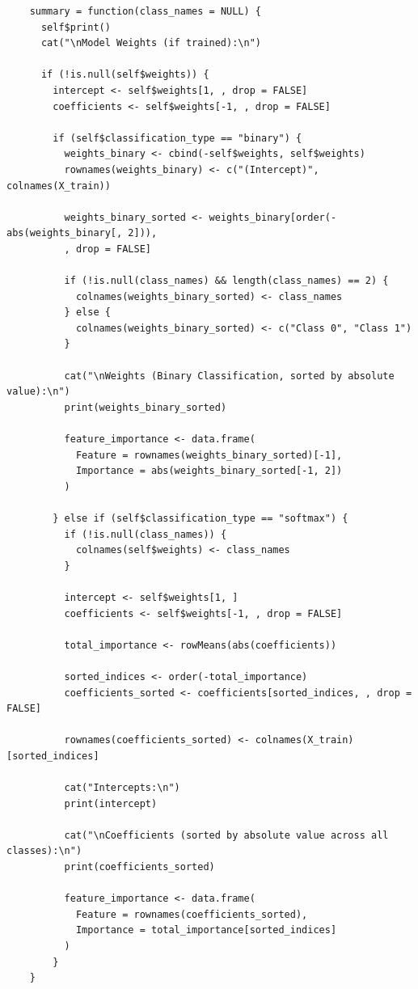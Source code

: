 \documentclass[10pt,french]{report}
\begin{document}
    \begin{verbatim}
    summary = function(class_names = NULL) {
      self$print()
      cat("\nModel Weights (if trained):\n")

      if (!is.null(self$weights)) {
        intercept <- self$weights[1, , drop = FALSE]  
        coefficients <- self$weights[-1, , drop = FALSE]  

        if (self$classification_type == "binary") {
          weights_binary <- cbind(-self$weights, self$weights)  
          rownames(weights_binary) <- c("(Intercept)", colnames(X_train)) 

          weights_binary_sorted <- weights_binary[order(-abs(weights_binary[, 2])), 
          , drop = FALSE]

          if (!is.null(class_names) && length(class_names) == 2) {
            colnames(weights_binary_sorted) <- class_names  
          } else {
            colnames(weights_binary_sorted) <- c("Class 0", "Class 1") 
          }

          cat("\nWeights (Binary Classification, sorted by absolute value):\n")
          print(weights_binary_sorted)

          feature_importance <- data.frame(
            Feature = rownames(weights_binary_sorted)[-1],  
            Importance = abs(weights_binary_sorted[-1, 2])  
          )

        } else if (self$classification_type == "softmax") {
          if (!is.null(class_names)) {
            colnames(self$weights) <- class_names
          }

          intercept <- self$weights[1, ]  
          coefficients <- self$weights[-1, , drop = FALSE]  

          total_importance <- rowMeans(abs(coefficients))

          sorted_indices <- order(-total_importance)
          coefficients_sorted <- coefficients[sorted_indices, , drop = FALSE]

          rownames(coefficients_sorted) <- colnames(X_train)[sorted_indices]  

          cat("Intercepts:\n")
          print(intercept)

          cat("\nCoefficients (sorted by absolute value across all classes):\n")
          print(coefficients_sorted)

          feature_importance <- data.frame(
            Feature = rownames(coefficients_sorted),
            Importance = total_importance[sorted_indices]
          )
        }
    }
    \end{verbatim}
\end{document}
